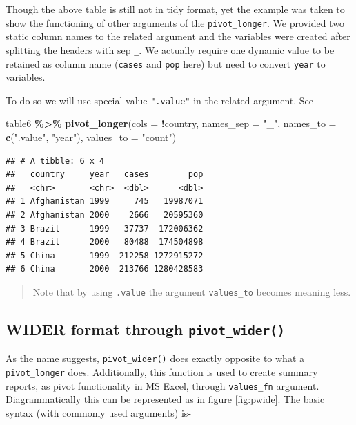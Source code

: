 \documentclass[
]{book}
\newenvironment{Shaded}{\begin{snugshade}}{\end{snugshade}}
\newcommand{\AttributeTok}[1]{\textcolor[rgb]{0.13,0.29,0.53}{#1}}
\newcommand{\FunctionTok}[1]{\textcolor[rgb]{0.13,0.29,0.53}{\textbf{#1}}}
\newcommand{\NormalTok}[1]{#1}
\newcommand{\SpecialCharTok}[1]{\textcolor[rgb]{0.81,0.36,0.00}{\textbf{#1}}}
\newcommand{\StringTok}[1]{\textcolor[rgb]{0.31,0.60,0.02}{#1}}
\begin{document}
Though the above table is still not in tidy format, yet the example was taken to show the functioning of other arguments of the \texttt{pivot\_longer}. We provided two static column names to the related argument and the variables were created after splitting the headers with sep \texttt{\_}. We actually require one dynamic value to be retained as column name (\texttt{cases} and \texttt{pop} here) but need to convert \texttt{year} to variables.

To do so we will use special value \texttt{".value"} in the related argument. See

\begin{Shaded}
\begin{Highlighting}[]
\NormalTok{table6 }\SpecialCharTok{\%\textgreater{}\%} 
  \FunctionTok{pivot\_longer}\NormalTok{(}\AttributeTok{cols =} \SpecialCharTok{!}\NormalTok{country,}
               \AttributeTok{names\_sep =} \StringTok{"\_"}\NormalTok{,}
               \AttributeTok{names\_to =} \FunctionTok{c}\NormalTok{(}\StringTok{".value"}\NormalTok{, }\StringTok{"year"}\NormalTok{),}
               \AttributeTok{values\_to =} \StringTok{"count"}\NormalTok{)}
\end{Highlighting}
\end{Shaded}

\begin{verbatim}
## # A tibble: 6 x 4
##   country     year   cases        pop
##   <chr>       <chr>  <dbl>      <dbl>
## 1 Afghanistan 1999     745   19987071
## 2 Afghanistan 2000    2666   20595360
## 3 Brazil      1999   37737  172006362
## 4 Brazil      2000   80488  174504898
## 5 China       1999  212258 1272915272
## 6 China       2000  213766 1280428583
\end{verbatim}

\begin{quote}
Note that by using \texttt{.value} the argument \texttt{values\_to} becomes meaning less.
\end{quote}

\hypertarget{wider-format-through-pivot_wider}{%
\subsection{\texorpdfstring{WIDER format through \texttt{pivot\_wider()}}{WIDER format through pivot\_wider()}}\label{wider-format-through-pivot_wider}}

As the name suggests, \texttt{pivot\_wider()} does exactly opposite to what a \texttt{pivot\_longer} does. Additionally, this function is used to create summary reports, as pivot functionality in MS Excel, through \texttt{values\_fn} argument. Diagrammatically this can be represented as in figure \ref{fig:pwide}. The basic syntax (with commonly used arguments) is-
\end{document}
